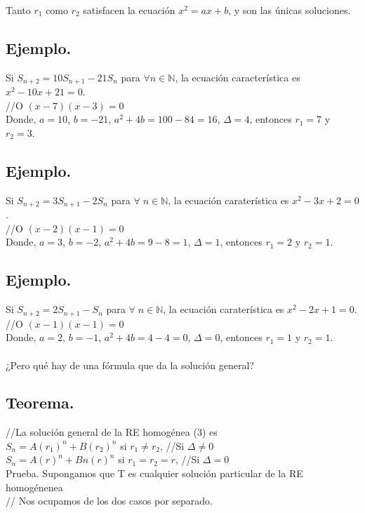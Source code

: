 \documentclass{article}
\begin{document}
Tanto $r_1$ como $r_2$ satisfacen la ecuación $x^2 = ax + b$, y son las únicas soluciones.

\subsection{Ejemplo.}
Si $S_{n+2} = 10S_{n+1} - 21S_n$ para $\forall n \in \mathbb{N}$, la ecuación característica es $x^2 - 10x +21 = 0$.\\
//O $(x-7)(x-3)=0$\\
Donde, $a=10$, $b=-21$, $a^2+4b=100-84=16$, $\Delta = 4$, entonces $r_1 = 7$ y $r_2 = 3$.

\subsection{Ejemplo.}
Si $S_{n+2} = 3S_{n+1}-2S_{n}$ para $\forall \; n \in \mathbb{N}$, la ecuación caraterística es $x^2-3x+2=0$.\\
//O $(x-2)(x-1)=0$\\
Donde, $a=3$, $b=-2$, $a^2+4b=9-8=1$, $\Delta = 1$, entonces $r_1=2$ y $r_2=1$.


\subsection{Ejemplo.}
Si $S_{n+2} = 2S_{n+1}- S_{n}$ para $\forall \; n \in \mathbb{N}$, la ecuación caraterística es $x^2-2x+1=0$.\\
//O $(x-1)(x-1)=0$\\
Donde, $a=2$, $b=-1$, $a^2+4b=4-4=0$, $\Delta = 0$, entonces $r_1=1$ y $r_2=1$.\\\\


¿Pero qué hay de una fórmula que da la solución general?

\subsection{Teorema.}
//La solución general de la RE homogénea (3) es\\

$S_n = A(r_1)^n + B(r_2)^n$ si $r_1 \neq r_2$, \;\;\;\;\;\;\;\;\;\;\; //Si $\Delta \neq 0$\\
$S_n = A(r)^n + Bn(r)^n$ si $r_1 = r_2 = r$, \;\;\;\;\;\;\;\;\;\;\; //Si $\Delta = 0$\\

Prueba. Supongamos que T es cualquier solución particular de la RE homogénenea\\
// Nos ocupamos de los dos casos por separado.\\
\end{document}
